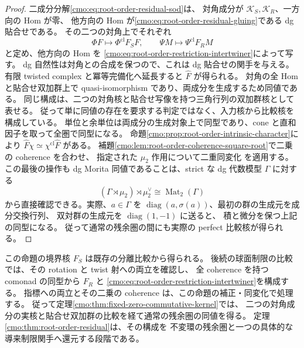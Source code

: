 \begin{proof}
二成分分解\eqref{cmo:eq:root-order-residual-sod}は、
対角成分が $\mathcal K_S,\mathcal K_R$、一方向の Hom が零、
他方向の Hom が\eqref{cmo:eq:root-order-residual-gluing}である dg 貼合せである。
その二つの対角上でそれぞれ
\[
 \Phi F\longmapsto\Phi^{\mathrm{cl}}F_SF,
 \qquad
 \Psi M\longmapsto\Psi^{\mathrm{cl}}F_RM
\]
と定め、他方向の Hom を
\eqref{cmo:eq:root-order-restriction-intertwiner}によって写す。
dg 自然性は対角との合成を保つので、これは dg 貼合せの関手を与える。
有限 twisted complex と冪等完備化へ延長すると $\widehat F$ が得られる。
対角の全 Hom と貼合せ双加群上で quasi-isomorphism であり、両成分を生成するため同値である。
同じ構成は、二つの対角核と貼合せ写像を持つ三角行列の双加群核として表せる。
従って単に同値の存在を要求する判定ではなく、入力核から比較核を構成している。
単位と余単位は両成分の生成対象上で同型であり、cone と直和因子を取って全圏で同型になる。
命題\ref{cmo:prop:root-order-intrinsic-character}により
$\widehat F\chi\simeq\chi^{\mathrm{cl}}\widehat F$ がある。
補題\ref{cmo:lem:root-order-coherence-square-root}で二乗の coherence を合わせ、
指定された $\mu_2$ 作用について二重同変化
\cite[Theorem~4.2]{MEDElagin}を適用する。
この最後の操作も dg Morita 同値であることは、strict な dg 代数模型 $\Gamma$ に対する
\[
 (\Gamma\rtimes\mu_2)\rtimes\mu_2^\vee
 \cong\operatorname{Mat}_2(\Gamma)
\]
から直接確認できる。実際、$a\in\Gamma$ を
$\operatorname{diag}(a,\sigma(a))$、最初の群の生成元を成分交換行列、
双対群の生成元を $\operatorname{diag}(1,-1)$ に送ると、
積と微分を保つ上記の同型になる。
従って通常の残余圏の間にも実際の perfect 比較核が得られる。
\end{proof}

この命題の境界核 $F_S$ は既存の分離比較から得られる。
後続の球面制限の比較では、その rotation と twist 射への両立を確認し、
全 coherence を持つ comonad の同型から $F_R$ と
\eqref{cmo:eq:root-order-restriction-intertwiner}を構成する。
指標への両立とその二乗の coherence は、この命題の補正・同変化で処理する。
従って定理\ref{cmo:thm:fixed-zero-commutative-kernel}では、
二つの対角成分の実核と貼合せ双加群の比較を経て通常の残余圏の同値を得る。
定理\ref{cmo:thm:root-order-residual}は、その構成を
不変環の残余圏と一つの具体的な導来制限関手へ還元する段階である。





